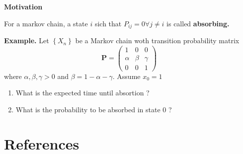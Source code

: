 \documentclass{article}
\theoremstyle{remark}
\begin{document}
\textbf{Motivation}  
\begin{definition}
  For a markov chain, a state $i$ sich that $P_{ij} = 0 \forall j\neq i$  is called \textbf{absorbing.} 
\end{definition}
 \begin{tcolorbox}
   \textbf{Example.} Let $\left\{ X_{n} \right\}$ be a Markov chain woth transition probability matrix \[
   \mathbf{P} = \begin{pmatrix}
   1  &  0  &  0 \\
   \alpha   &  \beta  &  \gamma  \\
   0  & 0  & 1
   \end{pmatrix} 
   \] 
   where $\alpha , \beta , \gamma > 0$ and $\beta = 1- \alpha -\gamma $. Assume $x_{0} = 1$
   \begin{enumerate}
     \item  What is the expected time until absortion ?
     \item What is the probability to be absorbed in state $0$ ?
   \end{enumerate}
 \end{tcolorbox}
 
\section{References}%
\label{sec:references}





\end{document}
